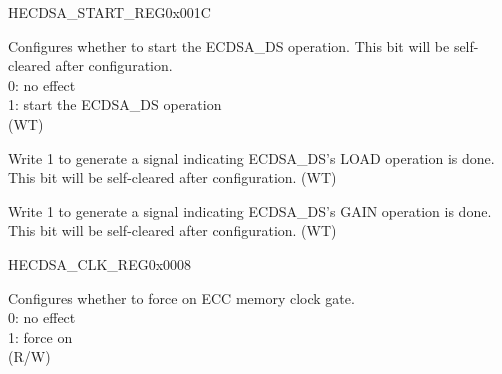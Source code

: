 \begin{register}{H}{ECDSA\_START\_REG}{0x001C}\label{regdesc:ECDSASTARTREG}
%
%
%
%
\regnewline%
\begin{regdesc}\begin{reglist}
\label{fielddesc:ECDSASTART}\item [ECDSA\_START] Configures whether to start the ECDSA\_DS operation. This bit will be self-cleared after configuration. \\
0: no effect\\
1: start the ECDSA\_DS operation\\
(WT)
\label{fielddesc:ECDSALOADDONE}\item [ECDSA\_LOAD\_DONE] Write 1 to generate a signal indicating ECDSA\_DS's LOAD operation is done. This bit will be self-cleared after configuration. (WT)
\label{fielddesc:ECDSAGETDONE}\item [ECDSA\_GET\_DONE] Write 1 to generate a signal indicating ECDSA\_DS's GAIN operation is done. This bit will be self-cleared after configuration. (WT)
\end{reglist}\end{regdesc}
\end{register}


\begin{register}{H}{ECDSA\_CLK\_REG}{0x0008}\label{regdesc:ECDSACLKREG}
%
%
\regnewline%
\begin{regdesc}\begin{reglist}
\label{fielddesc:ECDSACLKGATEFORCEON}\item [ECDSA\_CLK\_GATE\_FORCE\_ON] Configures whether to force on ECC memory clock gate. \\
0: no effect\\
1: force on\\
(R/W)
\end{reglist}\end{regdesc}
\end{register}


